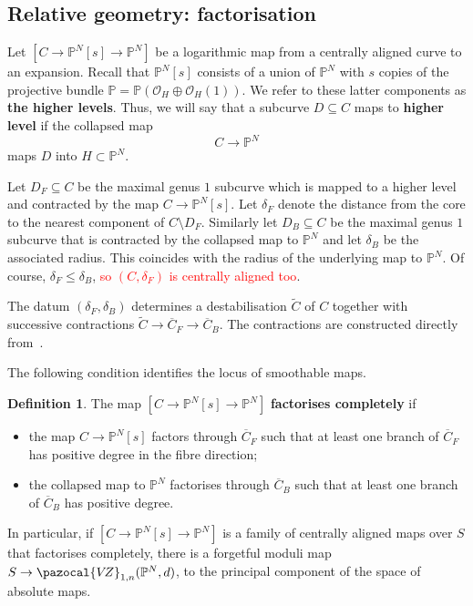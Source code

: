 \documentclass[11pt]{amsart}
\newcommand{\tred}{\textcolor{red}}
\newcommand{\VZ}{\pazocal{V\!Z}}
\renewcommand{\to}{\rightarrow}
\theoremstyle{definition}
\theoremstyle{definition}
\newtheorem{definition}[thm]{Definition}
\begin{document}
\subsection{Relative geometry: factorisation}\label{subsection factorisation} Let $[C\to \mathbb P^N[s]\to \mathbb P^N]$ be a logarithmic map from a centrally aligned curve to an expansion. Recall that $\mathbb P^N[s]$ consists of a union of $\mathbb P^N$ with $s$ copies of the projective bundle $\mathbb{P} = \mathbb P(\mathcal O_H\oplus \mathcal O_H(1))$. We refer to these latter components as \textbf{the higher levels}. Thus, we will say that a subcurve $D\subseteq C$ maps to \textbf{higher level} if the collapsed map
\[
C\to \mathbb P^N
\]
maps $D$ into $H\subset \mathbb P^N$. 

Let $D_F\subseteq C$ be the maximal genus $1$ subcurve which is mapped to a higher level and contracted by the map $C\to \mathbb P^N[s]$. Let $\delta_F$ denote the distance from the core to the nearest component of $C \setminus D_F$. Similarly let $D_B\subseteq C$ be the maximal genus $1$ subcurve that is contracted by the collapsed map to $\mathbb P^N$ and let $\delta_B$ be the associated radius. This coincides with the radius of the underlying map to $\mathbb P^N$. Of course, $\delta_F\leq \delta_B$, \tred{so $(C,\delta_F)$ is centrally aligned too}.

The datum $(\delta_F,\delta_B)$ determines a destabilisation $\widetilde C$ of $C$ together with successive contractions $\widetilde C\to \overline C_F\to\overline C_B$. The contractions are constructed directly from~\cite[Section~3]{RSPW}.

The following condition identifies the locus of smoothable maps. 

\begin{definition}
The map $[C\to \mathbb P^N[s]\to \mathbb P^N]$ \textbf{factorises completely} if
\begin{itemize}
\item the map $C\to \mathbb P^N[s]$ factors through $\overline C_F$ such that at least one branch of $\overline C_F$ has positive degree in the fibre direction; 
\item the collapsed map to $\mathbb P^N$ factorises through $\overline C_B$ such that at least one branch of $\overline C_B$ has positive degree.
\end{itemize}
\end{definition}

In particular, if $[C\to \mathbb P^N[s]\to \mathbb P^N]$ is a family of centrally aligned maps over $S$ that factorises completely, there is a forgetful moduli map $S\to \VZ_{1,n}(\mathbb P^N,d)$, to the principal component of the space of absolute maps.
\end{document}
